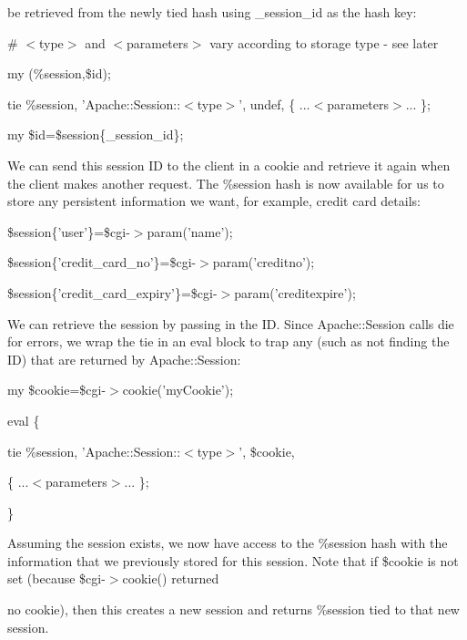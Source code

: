 \documentclass[a4paper,11pt]{book}
\begin{document}
\noindent be retrieved from the newly tied hash using \_session\_id as the hash key:

\noindent 

\noindent 

\noindent \# $<$type$>$ and $<$parameters$>$ vary according to storage type - see later

\noindent my (\%session,\$id);

\noindent tie \%session, 'Apache::Session::$<$type$>$', undef, \{ ...$<$parameters$>$... \};

\noindent my \$id=\$session\{\_session\_id\};

\noindent 

\noindent We can send this session ID to the client in a cookie and retrieve it again when the client makes another request. The \%session hash is now available for us to store any persistent information we want, for example, credit card details:

\noindent 

\noindent \$session\{'user'\}=\$cgi-$>$param('name');

\noindent \$session\{'credit\_card\_no'\}=\$cgi-$>$param('creditno');

\noindent \$session\{'credit\_card\_expiry'\}=\$cgi-$>$param('creditexpire');

\noindent 

\noindent We can retrieve the session by passing in the ID. Since Apache::Session calls die for errors, we wrap the tie in an eval block to trap any (such as not finding the ID) that are returned by Apache::Session:

\noindent 

\noindent my \$cookie=\$cgi-$>$cookie('myCookie');

\noindent eval \{

\noindent tie \%session, 'Apache::Session::$<$type$>$', \$cookie,

\noindent \{ ...$<$parameters$>$... \};

\noindent \}

\noindent 

\noindent Assuming the session exists, we now have access to the \%session hash with the information that we previously stored for this session. Note that if \$cookie is not set (because \$cgi-$>$cookie() returned

\noindent no cookie), then this creates a new session and returns \%session tied to that new session.

\noindent 
\end{document}
